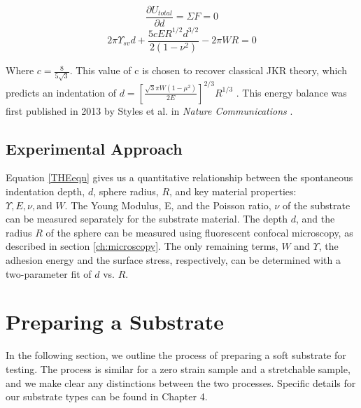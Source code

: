 \begin{equation*}
\frac{\partial U_{total}}{\partial d} = \Sigma F = 0
\end{equation*}
\begin{equation}
\label{THEeqn}
2 \pi \Upsilon_{sv}d  + \frac{5cER^{1/2}d^{3/2}}{2 \left( 1-\nu ^2 \right) }  - 2 \pi WR = 0
\end{equation}

Where $ c = \frac{8}{5\sqrt{3}} $. This value of c is chosen to recover classical JKR theory, which predicts an indentation of $ d =  \left[\frac{\sqrt{3}\pi W (1 - \mu^2)}{2E} \right]^{2/3}R^{1/3}$ \cite{style2013surface, johnson1971surface}. This energy balance was first published in 2013 by Styles et al. in \textit{Nature Communications} \cite{style2013surface}. 


\subsection{Experimental Approach}
Equation \ref{THEeqn} gives us a quantitative relationship between the spontaneous indentation depth, $ d $, sphere radius, $ R $, and key material properties: $ \Upsilon, E, \nu, \text{and }W $. The Young Modulus, E, and the Poisson ratio, $\nu$ of the substrate can be measured separately for the substrate material. The depth $d$, and the radius $R$ of the sphere can be measured using fluorescent confocal microscopy, as described in section \ref{ch:microscopy}. The only remaining terms, $W$ and $\Upsilon$, the adhesion energy and the surface stress, respectively, can be determined with a two-parameter fit of $ d $ vs. $ R. $ 

\section{Preparing a Substrate}
In the following section, we outline the process of preparing a soft substrate for testing. The process is similar for a zero strain sample and a stretchable sample, and we make clear any distinctions between the two processes. Specific details for our substrate types can be found in Chapter 4.

